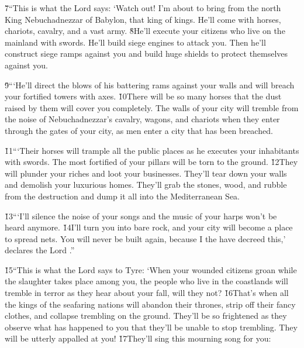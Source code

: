 \v{7}``This is what the Lord  says: `Watch out! I'm about to bring from the north King Nebuchadnezzar of Babylon, that king of kings. He'll come with horses, chariots, cavalry, and a vast army. \v{8}He'll execute your citizens who live on the mainland with swords. He'll build siege engines to attack you. Then he'll construct siege ramps against you and build huge shields to protect themselves against you.

\v{9}```He'll direct the blows of his battering rams against your walls and will breach your fortified towers with axes. \v{10}There will be so many horses that the dust raised by them will cover you completely. The walls of your city will tremble from the noise of Nebuchadnezzar's cavalry, wagons, and chariots when they enter through the gates of your city, as men enter a city that has been breached.

\v{11}```Their horses will trample all the public places as he executes your inhabitants with swords. The most fortified of your pillars will be torn to the ground. \v{12}They will plunder your riches and loot your businesses. They'll tear down your walls and demolish your luxurious homes. They'll grab the stones, wood, and rubble from the destruction and dump it all into the Mediterranean Sea.

\v{13}```I'll silence the noise of your songs and the music of your harps won't be heard anymore. \v{14}I'll turn you into bare rock, and your city will become a place to spread nets. You will never be built again, because I the  have decreed this,' declares the Lord .''

\v{15}``This is what the Lord  says to Tyre: `When your wounded citizens groan while the slaughter takes place among you, the people who live in the coastlands will tremble in terror as they hear about your fall, will they not? \v{16}That's when all the kings of the seafaring nations will abandon their thrones, strip off their fancy clothes, and collapse trembling on the ground. They'll be so frightened as they observe what has happened to you that they'll be unable to stop trembling. They will be utterly appalled at you! \v{17}They'll sing this mourning song for you:

